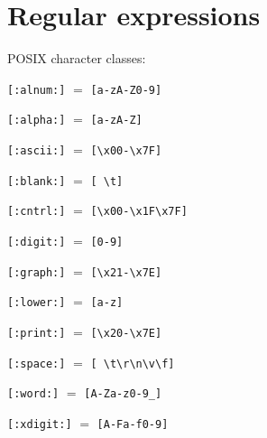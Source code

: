 \section{Regular expressions}
\begin{itemx}
\item POSIX character classes:
\begin{itemx}
\item \texttt{[:alnum:]} $=$ \texttt{[a-zA-Z0-9]}
\item \texttt{[:alpha:]} $=$ \texttt{[a-zA-Z]}
\item \texttt{[:ascii:]} $=$ \texttt{[\textbackslash{}x00-\textbackslash{}x7F]}
\item \texttt{[:blank:]} $=$ \texttt{[ \textbackslash{}t]}
\item \texttt{[:cntrl:]} $=$ \texttt{[\textbackslash{}x00-\textbackslash{}x1F\textbackslash{}x7F]}
\item \texttt{[:digit:]} $=$ \texttt{[0-9]}
\item \texttt{[:graph:]} $=$ \texttt{[\textbackslash{}x21-\textbackslash{}x7E]}
\item \texttt{[:lower:]} $=$ \texttt{[a-z]}
\item \texttt{[:print:]} $=$ \texttt{[\textbackslash{}x20-\textbackslash{}x7E]}
\item \texttt{[:space:]} $=$ \texttt{[ \textbackslash{}t\textbackslash{}r\textbackslash{}n\textbackslash{}v\textbackslash{}f]}
\item \texttt{[:word:]} $=$ \texttt{[A-Za-z0-9\_]}
\item \texttt{[:xdigit:]} $=$ \texttt{[A-Fa-f0-9]}
\end{itemx}
\end{itemx}
